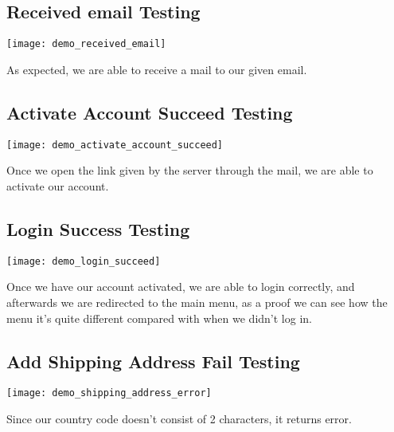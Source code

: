 \subsection[Received email Testing]{Received email Testing}\label{subsec:received-email-testing}
\begin{center}
    \texttt{[image: demo\_received\_email]}
\end{center}
\begin{flushleft}
    As expected, we are able to receive a mail to our given email.
\end{flushleft}

\subsection[Activate Account Succeed Testing]{Activate Account Succeed Testing}\label{subsec:activate-account-succeed-testing}
\begin{center}
    \texttt{[image: demo\_activate\_account\_succeed]}
\end{center}
\begin{flushleft}
    Once we open the link given by the server through the mail, we are able to activate our account.
\end{flushleft}

\subsection[Login Success Testing]{Login Success Testing}\label{subsec:login-success-testing}
\begin{center}
    \texttt{[image: demo\_login\_succeed]}
\end{center}
\begin{flushleft}
    Once we have our account activated, we are able to login correctly, and afterwards we are redirected to the main
    menu, as a proof we can see how the menu it's quite different compared with when we didn't log in.
\end{flushleft}

\subsection[Add Shipping Address Fail Testing ]{Add Shipping Address Fail Testing}\label{subsec:add-shipping-address-fail-testing}
\begin{center}
    \texttt{[image: demo\_shipping\_address\_error]}
\end{center}
\begin{flushleft}
    Since our country code doesn't consist of 2 characters, it returns error.
\end{flushleft}

